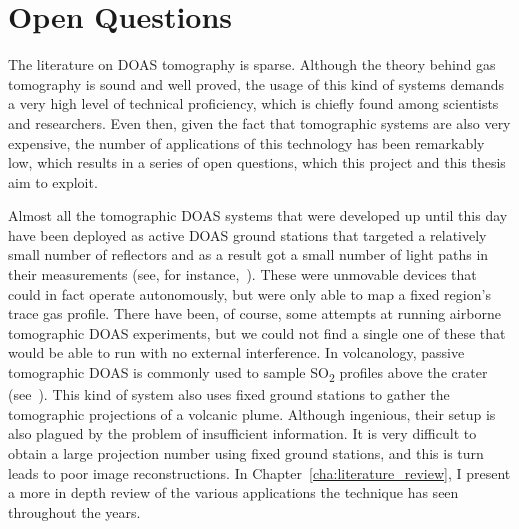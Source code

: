 
\section{Open Questions}%
\label{sec:open_questions}

The literature on DOAS tomography is sparse. Although the theory behind
gas tomography is sound and well proved, the usage of this kind of
systems demands a very high level of technical proficiency, which is
chiefly found among scientists and researchers. Even then, given the
fact that tomographic systems are also very expensive, the number of
applications of this technology has been remarkably low, which results
in a series of open questions, which this project and this thesis aim to
exploit. 

Almost all the tomographic DOAS systems that were developed up until
this day have been deployed as active DOAS ground stations that targeted
a relatively small number of reflectors and as a result got a small
number of light paths in their measurements (see, for
instance,~\cite{Pundt2005}). These were unmovable devices that could in
fact operate autonomously, but were only able to map a fixed region's
trace gas profile. There have been, of course, some attempts at running
airborne tomographic DOAS experiments, but we could not find a single
one of these that would be able to run with no external interference. In
volcanology, passive tomographic DOAS is commonly used to sample
SO\textsubscript{2} profiles above the crater
(see~\cite{Johansson2009}). This kind of system also uses fixed ground
stations to gather the tomographic projections of a volcanic plume.
Although ingenious, their setup is also plagued by the problem of
insufficient information. It is very difficult to obtain a large
projection number using fixed ground stations, and this is turn leads to
poor image reconstructions. In Chapter~\ref{cha:literature_review}, I
present a more in depth review of the various applications the technique
has seen throughout the years.

